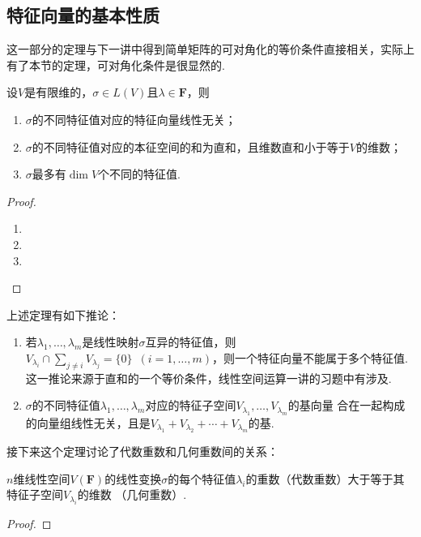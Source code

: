 \subsection{特征向量的基本性质}
这一部分的定理与下一讲中得到简单矩阵的可对角化的等价条件直接相关，实际上有了本节的定理，可对角化条件是很显然的.
\begin{theorem}
	设$V$是有限维的，$\sigma\in L(V)$且$\lambda\in\mathbf{F}$，则
	\begin{enumerate}[label=(\arabic*)]
        \item $\sigma$的不同特征值对应的特征向量线性无关；
        \item $\sigma$的不同特征值对应的本征空间的和为直和，且维数直和小于等于$V$的维数；
        \item $\sigma$最多有$\dim V$个不同的特征值.
    \end{enumerate}
\end{theorem}
\begin{proof}
    \begin{enumerate}[label=(\arabic*)]
        \item 
        \item 
        \item 
    \end{enumerate}
\end{proof}

上述定理有如下推论：
\begin{enumerate}
    \item 若$\lambda_1,\ldots,\lambda_m$是线性映射$\sigma$互异的特征值，则$V_{\lambda_i}\cap\sum\limits_{j\neq i}V_{\lambda_j}=\{0\}
    \enspace(i=1,\ldots,m)$，则一个特征向量不能属于多个特征值.这一推论来源于直和的一个等价条件，线性空间运算一讲的习题中有涉及.

    \item $\sigma$的不同特征值$\lambda_1,\ldots,\lambda_m$对应的特征子空间$V_{\lambda_1},\ldots,V_{\lambda_m}$的基向量
    合在一起构成的向量组线性无关，且是$V_{\lambda_1}+V_{\lambda_2}+\cdots+V_{\lambda_m}$的基.
\end{enumerate}

接下来这个定理讨论了代数重数和几何重数间的关系：
\begin{theorem}
    $n$维线性空间$V(\mathbf{F})$的线性变换$\sigma$的每个特征值$\lambda_i$的重数（代数重数）大于等于其特征子空间$V_{\lambda_i}$的维数
    （几何重数）.
\end{theorem}
\begin{proof}
    
\end{proof}

